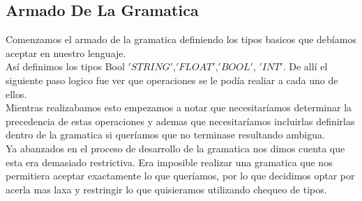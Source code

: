 \subsection{Armado De La Gramatica}
Comenzamos el armado de la gramatica definiendo los tipos basicos que debíamos aceptar en nuestro lenguaje.
\\
Así definimos los tipos Bool $'STRING'$,$'FLOAT'$,$'BOOL'$, $'INT'$. De allí el siguiente paso logico fue ver que operaciones se le podía realiar a cada uno de ellos.
\\
Mientras realizabamos esto empezamos a notar que necesitaríamos determinar la precedencia de estas operaciones y ademas que necesitaríamos incluirlas definirlas dentro de la gramatica si queríamos que no terminase resultando ambigua.
\\
Ya abanzados en el proceso de desarrollo de la gramatica nos dimos cuenta que esta era demasiado restrictiva. Era imposible realizar una gramatica que nos permitiera aceptar exactamente lo que queríamos, por lo que decidimos optar por acerla mas laxa y restringir lo que quisieramos utilizando chequeo de tipos.
\\
